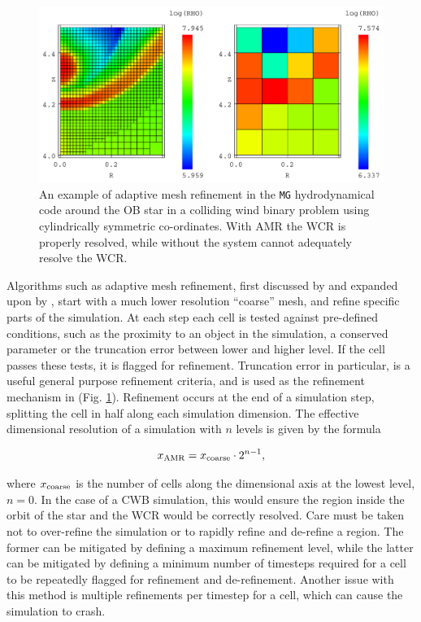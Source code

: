 \begin{figure}[h]
  \centering
  \includegraphics[width=5in]{assets/mergecellc.pdf}
  \caption[Adaptive mesh refinement comparison]{An example of adaptive mesh refinement in the \texttt{MG} hydrodynamical code around the OB star in a colliding wind binary problem using cylindrically symmetric co-ordinates. With AMR the WCR is properly resolved, while without the system cannot adequately resolve the WCR.}
  \label{fig:mgrefine}
\end{figure}

Algorithms such as adaptive mesh refinement, first discussed by \textcite{bergerAdaptiveMeshRefinement1984} and expanded upon by \textcite{bergerLocalAdaptiveMesh1989}, start with a much lower resolution ``coarse'' mesh, and refine specific parts of the simulation.
At each step each cell is tested against pre-defined conditions, such as the proximity to an object in the simulation, a conserved parameter or the truncation error between lower and higher level.
If the cell passes these tests, it is flagged for refinement.
Truncation error in particular, is a useful general purpose refinement criteria, and is used as the refinement mechanism in \mg{} (Fig. \ref{fig:mgrefine}).
Refinement occurs at the end of a simulation step, splitting the cell in half along each simulation dimension.
The effective dimensional resolution of a simulation with $n$ levels is given by the formula

\begin{equation}
  x_\text{AMR} = x_\text{coarse} \cdot 2^{n-1},
\end{equation}

\noindent
where $x_\text{coarse}$ is the number of cells along the dimensional axis at the lowest level, $n=0$.
In the case of a CWB simulation, this would ensure the region inside the orbit of the star and the WCR would be correctly resolved.
Care must be taken not to over-refine the simulation or to rapidly refine and de-refine a region.
The former can be mitigated by defining a maximum refinement level, while the latter can be mitigated by defining a minimum number of timesteps required for a cell to be repeatedly flagged for refinement and de-refinement.
Another issue with this method is multiple refinements per timestep for a cell, which can cause the simulation to crash.

